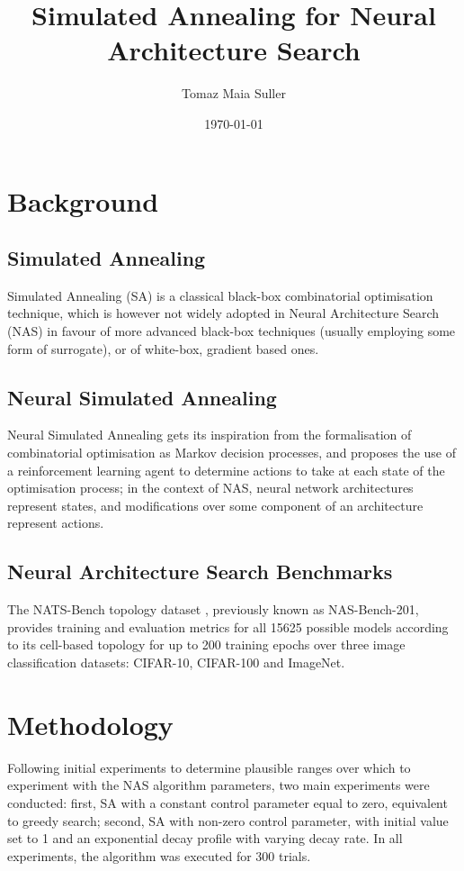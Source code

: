 \documentclass{article}
\title{Simulated Annealing for Neural Architecture Search}
\author{Tomaz Maia Suller}
\date{\today}
\begin{document}
\maketitle

\section{Background}

\subsection{Simulated Annealing}
Simulated Annealing (SA) is a classical black-box combinatorial
optimisation technique, which is however not widely adopted in
Neural Architecture Search (NAS) in favour of more advanced
black-box techniques (usually employing some form of surrogate),
or of white-box, gradient based ones.

\subsection{Neural Simulated Annealing}
Neural Simulated Annealing gets its inspiration from
the formalisation of combinatorial optimisation as Markov decision
processes, and proposes the use of a reinforcement learning agent
to determine actions to take at each state of the optimisation
process; in the context of NAS, neural network architectures
represent states, and modifications over some component of an
architecture represent actions.

\subsection{Neural Architecture Search Benchmarks}
The NATS-Bench topology dataset \cite{nats-bench}, previously
known as NAS-Bench-201, provides training and evaluation metrics
for all 15625 possible models according to its cell-based topology
for up to 200 training epochs over three image classification
datasets: CIFAR-10, CIFAR-100 and ImageNet.


\section{Methodology}
Following initial experiments to determine plausible ranges over
which to experiment with the NAS algorithm parameters, two main
experiments were conducted:
first, SA with a constant control parameter equal to zero,
equivalent to greedy search;
second, SA with non-zero control parameter, with initial value set
to 1 and an exponential decay profile with varying decay rate.
In all experiments, the algorithm was executed for 300 trials.
\end{document}
